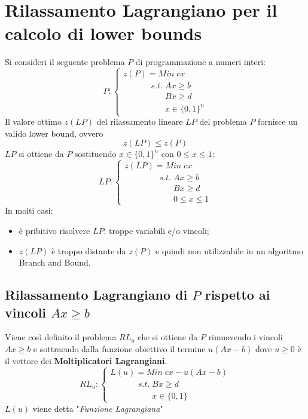 \chapter{Rilassamento Lagrangiano per il calcolo di lower bounds}
Si consideri il seguente problema $P$ di programmazione a numeri interi:
\begin{displaymath}
P:
\begin{cases}
	z(P)=Min\;cx \\
	\;\;\;\;\;\;\;\;\;\;\;\;s.t.\;Ax\ge b \\
	\;\;\;\;\;\;\;\;\;\;\;\;\;\;\;\;\;\;Bx\ge d \\
	\;\;\;\;\;\;\;\;\;\;\;\;\;\;\;\;\;\;x\in\{0,1\}^{n} 
\end{cases}
\end{displaymath}
Il valore ottimo $z(LP)$ del rilassamento lineare $LP$ del problema $P$ fornisce un valido lower bound, ovvero
\begin{equation}
	z(LP)\le z(P)
\end{equation}
$LP$ si ottiene da $P$ sostituendo $x\in\{0,1\}^{n}$ con $0\le x\le 1$:
\begin{displaymath}
LP:
\begin{cases}
z(LP)=Min\;cx \\
\;\;\;\;\;\;\;\;\;\;\;\;\;\;\;s.t.\;Ax\ge b \\
\;\;\;\;\;\;\;\;\;\;\;\;\;\;\;\;\;\;\;\;\;Bx\ge d \\
\;\;\;\;\;\;\;\;\;\;\;\;\;\;\;\;\;\;\;\;\;0\le x\le 1
\end{cases}
\end{displaymath}
In molti casi:
\begin{itemize}
	\item è pribitivo risolvere $LP$: troppe variabili e/o vincoli;
	\item $z(LP)$ è troppo distante da $z(P)$ e quindi non utilizzabile in un algoritmo Branch and Bound.
\end{itemize}

\section{Rilassamento Lagrangiano di $P$ rispetto ai vincoli $Ax\ge b$}
Viene così definito il problema $RL_{u}$ che si ottiene da $P$ rimuovendo i vincoli $Ax\ge b$ e sottraendo dalla funzione obiettivo il termine $u(Ax-b)$ dove $u\ge 0$ è il vettore dei \textbf{Moltiplicatori Lagrangiani}.
\begin{displaymath}
	RL_{u}:
	\begin{cases}
		L(u)=Min\;cx-u(Ax-b) \\
		\;\;\;\;\;\;\;\;\;\;\;\;s.t.\;Bx\ge d \\
		\;\;\;\;\;\;\;\;\;\;\;\;\;\;\;\;\;\;x\in\{0,1\}
	\end{cases}
\end{displaymath}
$L(u)$ viene detta "\textit{Funzione Lagrangiana}"

